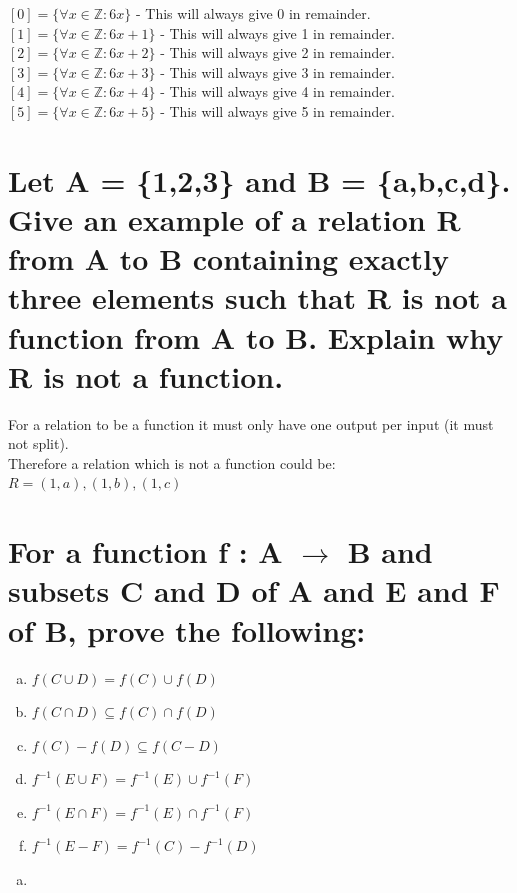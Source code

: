 \begin{center}
$[0]=\{\forall x\in \mathbb{Z}:6x\}$ - This will always give 0 in remainder.\\
$[1]=\{\forall x\in \mathbb{Z}:6x+1\}$ - This will always give 1 in remainder.\\
$[2]=\{\forall x\in \mathbb{Z}:6x+2\}$ - This will always give 2 in remainder.\\
$[3]=\{\forall x\in \mathbb{Z}:6x+3\}$ - This will always give 3 in remainder.\\
$[4]=\{\forall x\in \mathbb{Z}:6x+4\}$ - This will always give 4 in remainder.\\
$[5]=\{\forall x\in \mathbb{Z}:6x+5\}$ - This will always give 5 in remainder.\\
\end{center}

\newpage
\section{Let A = \{1,2,3\} and B = \{a,b,c,d\}. Give an example of a relation R from A to B containing exactly three elements such that R is not a function from A to B. Explain why R is not a function.}
For a relation to be a function it must only have one output per input (it must not split).\\
Therefore a relation which is not a function could be:\\
$R={(1,a),(1,b),(1,c)}$\\
\newpage
\section{For a function f : A $\rightarrow$ B and subsets C and D of A and E and F of B, prove the following:}
\begin{enumerate}[a.]
\item $f(C \cup D) = f(C) \cup f(D)$
\item $f(C \cap D) \subseteq f(C) \cap f(D)$
\item $f(C) - f(D) \subseteq f(C-D)$
\item $f^{-1}(E \cup F) = f^{-1}(E) \cup f^{-1}(F)$
\item $f^{-1}(E \cap F) = f^{-1}(E) \cap f^{-1}(F)$
\item $f^{-1}(E - F) = f^{-1}(C) - f^{-1}(D)$
\end{enumerate}
\begin{enumerate}[a.]
\item 
\end{enumerate}
\newpage
